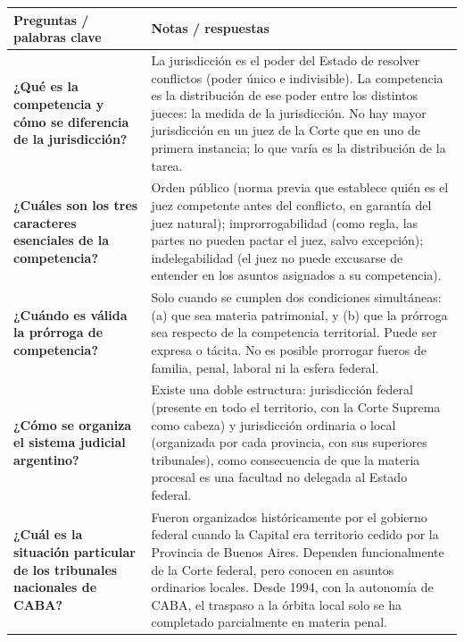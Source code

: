 \documentclass[12pt,oneside]{book}
\begin{document}
\begin{table}[H]
\centering
\begin{tabularx}{\textwidth}{
    >{\raggedright\arraybackslash}p{}
    >{\raggedright\arraybackslash}X
}
\toprule
\textbf{Preguntas / palabras clave} &
\textbf{Notas / respuestas} \\
\midrule

\textbf{¿Qué es la competencia y cómo se diferencia de la jurisdicción?} &
La jurisdicción es el poder del Estado de resolver conflictos (poder único e indivisible). La competencia es la distribución de ese poder entre los distintos jueces: la medida de la jurisdicción. No hay mayor jurisdicción en un juez de la Corte que en uno de primera instancia; lo que varía es la distribución de la tarea. \\

\textbf{¿Cuáles son los tres caracteres esenciales de la competencia?} &
Orden público (norma previa que establece quién es el juez competente antes del conflicto, en garantía del juez natural); improrrogabilidad (como regla, las partes no pueden pactar el juez, salvo excepción); indelegabilidad (el juez no puede excusarse de entender en los asuntos asignados a su competencia). \\

\textbf{¿Cuándo es válida la prórroga de competencia?} &
Solo cuando se cumplen dos condiciones simultáneas: (a) que sea materia patrimonial, y (b) que la prórroga sea respecto de la competencia territorial. Puede ser expresa o tácita. No es posible prorrogar fueros de familia, penal, laboral ni la esfera federal. \\

\textbf{¿Cómo se organiza el sistema judicial argentino?} &
Existe una doble estructura: jurisdicción federal (presente en todo el territorio, con la Corte Suprema como cabeza) y jurisdicción ordinaria o local (organizada por cada provincia, con sus superiores tribunales), como consecuencia de que la materia procesal es una facultad no delegada al Estado federal. \\

\textbf{¿Cuál es la situación particular de los tribunales nacionales de CABA?} &
Fueron organizados históricamente por el gobierno federal cuando la Capital era territorio cedido por la Provincia de Buenos Aires. Dependen funcionalmente de la Corte federal, pero conocen en asuntos ordinarios locales. Desde 1994, con la autonomía de CABA, el traspaso a la órbita local solo se ha completado parcialmente en materia penal. \\


\end{tabularx}
\end{table}
\end{document}
